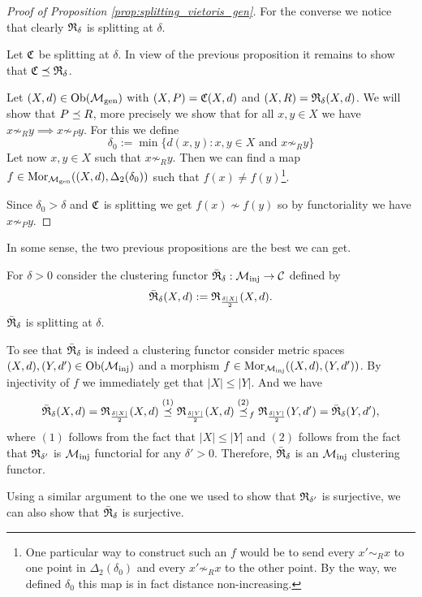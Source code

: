 \begin{proof}[Proof of Proposition \ref{prop:splitting_vietoris_gen}]
    For the converse we notice that clearly $\mathfrak{R}_\delta$ is splitting at $\delta$.

    \medskip
    Let $\mathfrak{C}$ be splitting at $\delta$. In view of the previous proposition it remains to show that $\mathfrak{C} \preceq \mathfrak{R}_\delta$.
        
    Let $(X,d) \in \mathrm {Ob}({\mathcal{M}_\mathrm{gen}})$ with $(X,P) = \mathfrak{C}(X,d)$ and $(X,R) = \mathfrak{R}_\delta(X,d)$. We will show that $P \preceq R$, more precisely we show that for all $x,y \in X$ we have $x \not\sim_R y \implies x \not\sim_P y$. For this we define
    $$
    \delta_0 := \min\{d(x,y): x,y \in X \text{ and } x \not\sim_R y\}
    $$
    Let now $x,y \in X$ such that $x \not\sim_R y$.
    Then we can find a map $f \in \mathrm {Mor}_{\mathcal{M}_\mathrm{gen}}((X,d), \Delta_2(\delta_0))$ such that $f(x) \neq f(y)$\footnote{One particular way to construct such an $f$ would be to send every $x' \sim_R x$ to one point in $\Delta_2(\delta_0)$ and every $x' \not\sim_R x$ to the other point. By the way, we defined $\delta_0$ this map is in fact distance non-increasing.}.

    Since $\delta_0 > \delta$ and $\mathfrak{C}$ is splitting we get $f(x) \not\sim f(y)$ so by functoriality we have $x \not\sim_P y$.
\end{proof}

\begin{example}{}{}
In some sense, the two previous propositions are the best we can get. 

For $\delta>0$ consider the clustering functor $\bar{\mathfrak{R}}_\delta: {\mathcal{M}_\mathrm{inj}} \to \mathcal{C}$ defined by
$$
\bar{\mathfrak{R}}_\delta(X,d) := \mathfrak{R}_{\frac{\delta|X|}{2}}(X,d).
$$
$\bar{\mathfrak{R}}_\delta$ is splitting at $\delta$.

\medskip
To see that $\bar{\mathfrak{R}}_\delta$ is indeed a clustering functor consider metric spaces ${(X,d), (Y,d') \in \mathrm {Ob}({\mathcal{M}_\mathrm{inj}})}$ and a morphism $f \in \mathrm {Mor}_{\mathcal{M}_\mathrm{inj}}((X,d), (Y,d'))$. By injectivity of $f$ we immediately get that $|X| \le |Y|$. And we have
$$
\bar{\mathfrak{R}}_\delta(X,d) = \mathfrak{R}_{\frac{\delta|X|}{2}}(X,d) \overset{(1)}{\preceq} \mathfrak{R}_{\frac{\delta|Y|}{2}}(X,d) \overset{(2)}{\preceq}_f \mathfrak{R}_{\frac{\delta|Y|}{2}}(Y,d') = \bar{\mathfrak{R}}_\delta(Y,d'),
$$
where $(1)$ follows from the fact that $|X| \le |Y|$ and $(2)$ follows from the fact that $\mathfrak{R}_{\delta'}$ is ${\mathcal{M}_\mathrm{inj}}$ functorial for any $\delta' > 0$. Therefore, $\bar{\mathfrak{R}}_\delta$ is an ${\mathcal{M}_\mathrm{inj}}$ clustering functor.

\medskip
Using a similar argument to the one we used to show that $\mathfrak{R}_{\delta'}$ is surjective, we can also show that $\bar{\mathfrak{R}}_\delta$ is surjective.

\end{example}

